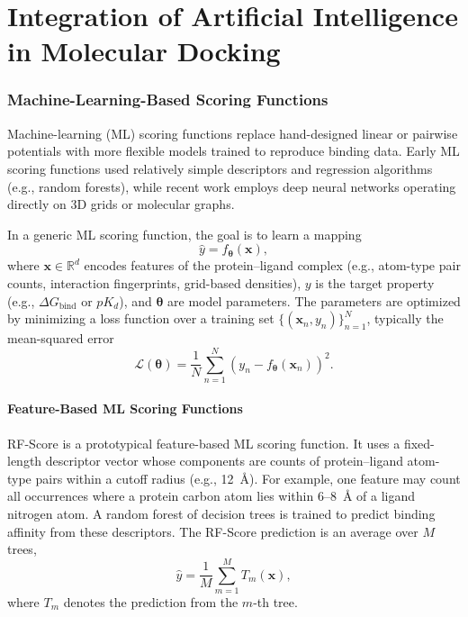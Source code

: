 \chapter*{Integration of Artificial Intelligence in Molecular Docking}





\subsection{Machine-Learning-Based Scoring Functions}

Machine-learning (ML) scoring functions replace hand-designed linear or pairwise potentials with more flexible models trained to reproduce binding data. Early ML scoring functions used relatively simple descriptors and regression algorithms (e.g., random forests), while recent work employs deep neural networks operating directly on 3D grids or molecular graphs.\cite{CH3_Ballester2010_RFScore,CH3_Wojcikowski2017_RFScoreVS,CH3_Jimenez2018_KDEEP}

In a generic ML scoring function, the goal is to learn a mapping
\begin{equation}
\hat{y} = f_{\boldsymbol{\theta}}(\mathbf{x}),
\end{equation}
where $\mathbf{x} \in \mathbb{R}^d$ encodes features of the protein--ligand complex (e.g., atom-type pair counts, interaction fingerprints, grid-based densities), $y$ is the target property (e.g., $\Delta G_{\text{bind}}$ or $pK_d$), and $\boldsymbol{\theta}$ are model parameters. The parameters are optimized by minimizing a loss function over a training set $\{(\mathbf{x}_n, y_n)\}_{n=1}^N$, typically the mean-squared error
\begin{equation}
\mathcal{L}(\boldsymbol{\theta}) = \frac{1}{N} \sum_{n=1}^N \left( y_n - f_{\boldsymbol{\theta}}(\mathbf{x}_n) \right)^2.
\end{equation}

\subsubsection{Feature-Based ML Scoring Functions}

RF-Score is a prototypical feature-based ML scoring function.\cite{CH3_Ballester2010_RFScore} It uses a fixed-length descriptor vector whose components are counts of protein--ligand atom-type pairs within a cutoff radius (e.g., 12~\AA). For example, one feature may count all occurrences where a protein carbon atom lies within 6--8~\AA{} of a ligand nitrogen atom. A random forest of decision trees is trained to predict binding affinity from these descriptors. The RF-Score prediction is an average over $M$ trees,
\begin{equation}
\hat{y} = \frac{1}{M} \sum_{m=1}^{M} T_m(\mathbf{x}),
\end{equation}
where $T_m$ denotes the prediction from the $m$-th tree.

